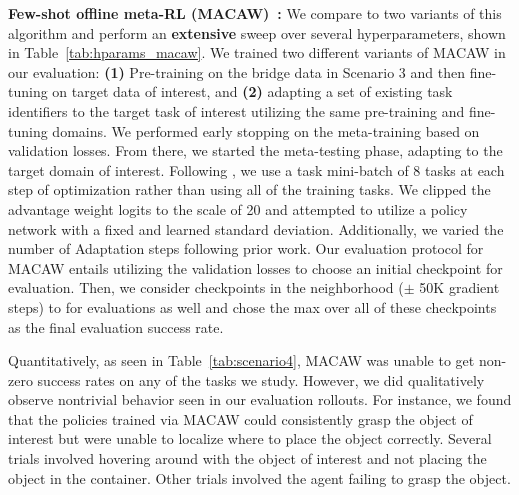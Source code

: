 \documentclass[../thesis.tex]{subfiles}
\begin{document}
\textbf{Few-shot offline meta-RL (MACAW)~\citep{mitchell2021offline}:} We compare to two variants of this algorithm and perform an \textbf{extensive} sweep over several hyperparameters, shown in Table~\ref{tab:hparams_macaw}. 
We trained two different variants of MACAW in our evaluation: \textbf{(1)} Pre-training on the bridge data in Scenario 3 and then fine-tuning on target data of interest, and \textbf{(2)} adapting a set of existing task identifiers to the target task of interest utilizing the same pre-training and fine-tuning domains. We performed early stopping on the meta-training based on validation losses. From there, we started the meta-testing phase, adapting to the target domain of interest. Following \citet{mitchell2021offline}, we use a task mini-batch of 8 tasks at each step of optimization rather than using all of the training tasks. We clipped the advantage weight logits to the scale of 20 and attempted to utilize a policy network with a fixed and learned standard deviation. Additionally, we varied the number of Adaptation steps following prior work. Our evaluation protocol for MACAW entails utilizing the validation losses to choose an initial checkpoint for evaluation. Then, we consider checkpoints in the neighborhood ($\pm$ 50K gradient steps) to for evaluations as well and chose the max over all of these checkpoints as the final evaluation success rate.


{
Quantitatively, as seen in Table~\ref{tab:scenario4}, MACAW was unable to get non-zero success rates on any of the tasks we study. However, we did qualitatively observe nontrivial behavior seen in our evaluation rollouts. For instance, we found that the policies trained via MACAW could consistently grasp the object of interest but were unable to localize where to place the object correctly. Several trials involved hovering around with the object of interest and not placing the object in the container. Other trials involved the agent failing to grasp the object.
}
\end{document}
